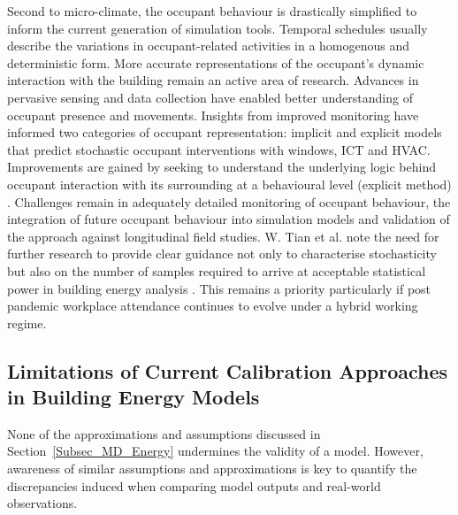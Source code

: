 \documentclass[preprint,12pt, sort&compress]{elsarticle}
\begin{document}
Second to micro-climate, the occupant behaviour is drastically simplified to inform the current generation of simulation tools. Temporal schedules usually describe the variations in occupant-related activities in a homogenous and deterministic form. More accurate representations of the occupant’s dynamic interaction with the building remain an active area of research. Advances in pervasive sensing and data collection have enabled better understanding of occupant presence and movements. Insights from improved monitoring have informed two categories of occupant representation: implicit and explicit models that predict stochastic occupant interventions with windows, ICT and HVAC. Improvements are gained by seeking to understand the underlying logic behind occupant interaction with its surrounding at a behavioural level (explicit method) \cite{hong2016}. Challenges remain in adequately detailed monitoring of occupant behaviour, the integration of future occupant behaviour into simulation models and validation of the approach against longitudinal field studies. W. Tian et al. \cite{tian2018} note the need for further research to provide clear guidance not only to characterise stochasticity but also on the number of samples required to arrive at acceptable statistical power in building energy analysis \cite{tian2018}. This remains a priority particularly if post pandemic workplace attendance continues to evolve under a hybrid working regime.


\subsection{Limitations of Current Calibration Approaches in Building Energy Models}
\label{Subsec_Limitations}

None of the approximations and assumptions discussed in Section~\ref{Subsec_MD_Energy} undermines the validity of a model. However, awareness of similar assumptions and approximations is key to quantify the discrepancies induced when comparing model outputs and real-world observations.
\end{document}
